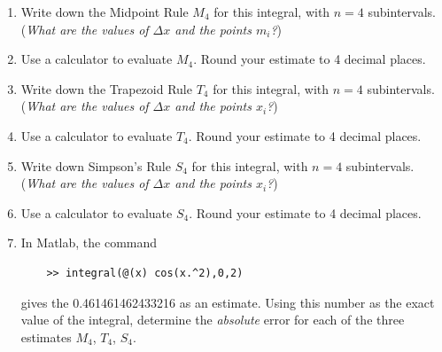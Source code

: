\documentclass[11pt,fleqn]{article}
\begin{document}
\medskip
\begin{enumerate}
\item Write down the Midpoint Rule $M_4$ for this integral, with $n=4$ subintervals.  (\emph{What are the values of $\Delta x$ and the points $m_i$?})

\vspace{1in}

\item Use a calculator to evaluate $M_4$.  Round your estimate to 4 decimal places.

\vfill

\item Write down the Trapezoid Rule $T_4$ for this integral, with $n=4$ subintervals.  (\emph{What are the values of $\Delta x$ and the points $x_i$?})\\

\vspace{1in}

\item Use a calculator to evaluate $T_4$.  Round your estimate to 4 decimal places.

\vfill
\newpage
\item Write down Simpson's Rule $S_4$ for this integral, with $n=4$ subintervals.  (\emph{What are the values of $\Delta x$ and the points $x_i$?})

\vspace{2in}

\item Use a calculator to evaluate $S_4$.  Round your estimate to 4 decimal places.

\vfill

\item In Matlab, the command
\begin{verbatim}
    >> integral(@(x) cos(x.^2),0,2)
\end{verbatim}
gives the 0.461461462433216 as an estimate.  Using this number as the exact value of the integral, determine the \emph{absolute} error for each of the three estimates $M_4$, $T_4$, $S_4$.
\vfill
\end{enumerate}
\end{document}
